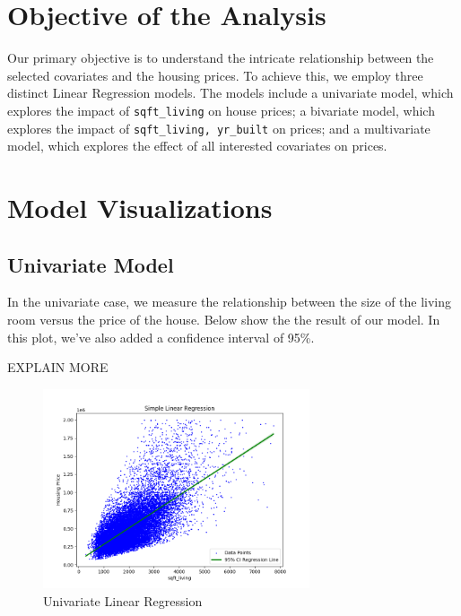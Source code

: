 \documentclass[11pt,a4paper]{article}
\begin{document}
\newpage
\section{Objective of the Analysis}
Our primary objective is to understand the intricate relationship between the
selected covariates and the housing prices. To achieve this, we employ three
distinct Linear Regression models. The models include a univariate model, which
explores the impact of \verb|sqft_living| on house prices; a bivariate model,
which explores the impact of \verb|sqft_living, yr_built| on prices; and a
multivariate model, which explores the effect of all interested covariates on
prices.

\newpage
\section{Model Visualizations}

\subsection{Univariate Model}

In the univariate case, we measure the relationship between the size of the
living room versus the price of the house. Below show the the result of our
model. In this plot, we've also added a confidence interval of 95\%.

{\color{red}EXPLAIN MORE}

\begin{figure}[H]
    \centering
    \includegraphics*[width=0.7\textwidth]{simple_regression.png}
    \caption{Univariate Linear Regression}
    \label{fig: univariate}
\end{figure}
\end{document}
